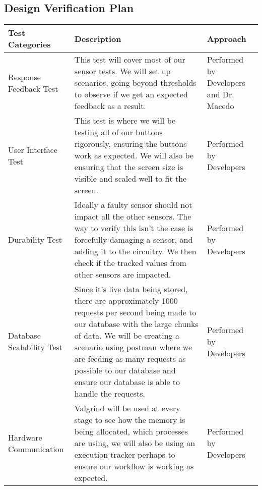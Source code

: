 \documentclass[12pt, titlepage]{article}
\begin{document}
\subsection{Design Verification Plan}
\begin{tabular}{|p{2cm}|p{8cm}|p{4cm}|}
  \hline
  \label{sec_4_3}\textbf{Test Categories} & \textbf{Description}                                                                                                                                                                                                                                                                                                 & \textbf{Approach}                      \\
  \hline
  Response Feedback Test                  & This test will cover most of our sensor tests. We will set up scenarios, going beyond thresholds to observe if we get an expected feedback as a result.                                                                                                                                                              & Performed by Developers and Dr. Macedo \\
  \hline
  User Interface Test                     & This test is where we will be testing all of our buttons rigorously, ensuring the buttons work as expected. We will also be ensuring that the screen size is visible and scaled well to fit the screen.                                                                                                              & Performed by Developers                \\
  \hline
  Durability Test                         & Ideally a faulty sensor should not impact all the other sensors. The way to verify this isn't the case is forcefully damaging a sensor, and adding it to the circuitry. We then check if the tracked values from other sensors are impacted.                                                                         & Performed by Developers                \\
  \hline
  Database Scalability Test               & Since it's live data being stored, there are approximately 1000 requests per second being made to our database with the large chunks of data. We will be creating a scenario using postman where we are feeding as many requests as possible to our database and ensure our database is able to handle the requests. & Performed by Developers                \\
  \hline
  Hardware Communication                  & Valgrind will be used at every stage to see how the memory is being allocated, which processes are using, we will also be using an execution tracker perhaps to ensure our workflow is working as expected.                                                                                                          & Performed by Developers                \\
  \hline
\end{tabular}
\pagebreak
\end{document}
